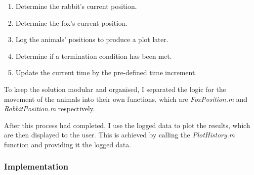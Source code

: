 \documentclass[11pt]{article}
\begin{document}
\begin{enumerate}
	\item {Determine the rabbit's current position.}
	\item {Determine the fox's current position.}
	\item {Log the animals' positions to produce a plot later.}
	\item {Determine if a termination condition has been met.}
	\item{Update the current time by the pre-defined time increment.}
\end{enumerate}

To keep the solution modular and organised, I separated the logic for the movement of the animals into their own functions, which are \textit{FoxPosition.m} and \textit{RabbitPosition.m} respectively. 

After this process had completed, I use the logged data to plot the results, which are then displayed to the user. This is achieved by calling the \textit{PlotHistory.m} function and providing it the logged data.

\subsubsection{Implementation}
\end{document}
